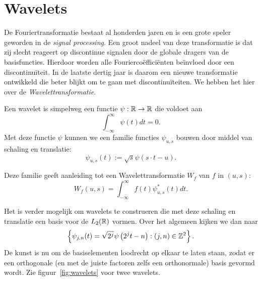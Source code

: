 \chapter{Wavelets}
\label{waveletsH}
De Fouriertransformatie bestaat al honderden jaren en is een grote speler geworden in de \emph{signal processing}. 
Een groot nadeel van deze transformatie is dat zij slecht reageert op discontinue signalen 
door de globale dragers van de basisfuncties. 
Hierdoor worden alle Fourierco\"effici\"enten be\"invloed door een discontinu\"iteit.
In de laatste dertig jaar is daarom een nieuwe transformatie ontwikkeld die beter blijkt om te gaan
met discontinu\"iteiten. We hebben het hier over de \emph{Wavelettransformatie}.

\begin{definitie}
  Een wavelet is simpelweg een functie $\psi: \mathbb{R} \to \mathbb{R}$ die voldoet aan
  \[
  \int_{-\infty}^{\infty} \psi(t) dt = 0.
  \]
  Met deze functie $\psi$ kunnen we een familie functies $\psi_{u,s}$ bouwen door middel van schaling en translatie:
  \[
  \psi_{u,s}(t) := \sqrt{s} \psi\left(s\cdot t-u\right).
  \]
\end{definitie}

Deze familie geeft aanleiding tot een Wavelettransformatie $W_f$ van $f$ in $(u,s)$:
\[
W_f(u,s) = \int_{-\infty}^\infty f(t) \psi^*_{u,s}(t) dt.
\]

Het is verder mogelijk om wavelets te construeren die met deze schaling en translatie een basis voor de $L_2(\mathbb{R})$ vormen. 
Over het algemeen kijken we dan naar
\[
\left\{ \psi_{j,n}(t) = \sqrt{2^j} \psi\left( 2^j t - n\right) : (j,n) \in \mathbb{Z}^2 \right\}.
\]
De kunst is nu om de basiselementen loodrecht op elkaar te laten staan, zodat er een orthogonale 
(en met de juiste factoren zelfs een orthonormale) basis gevormd wordt. 
Zie figuur~\ref{fig:wavelets} voor twee wavelets.

